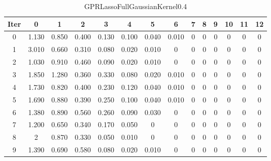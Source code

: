 \begin{table}
	\begin{center}
		\begin{tabular}{|c|c|c|c|c|c|c|c|c|c|c|c|c|c|}
			\hline
			Iter & 0 & 1 & 2 & 3 & 4 & 5 & 6 & 7 & 8 & 9 & 10 & 11 & 12 \\
			\hline
			0 & 1.130 & 0.850 & 0.400 & 0.130 & 0.100 & 0.040 & 0.010 & 0 & 0 & 0 & 0 & 0 & 0 \\
			\hline
			1 & 3.010 & 0.660 & 0.310 & 0.080 & 0.020 & 0.010 & 0 & 0 & 0 & 0 & 0 & 0 & 0 \\
			\hline
			2 & 1.030 & 0.910 & 0.460 & 0.090 & 0.020 & 0.010 & 0 & 0 & 0 & 0 & 0 & 0 & 0 \\
			\hline
			3 & 1.850 & 1.280 & 0.360 & 0.330 & 0.080 & 0.020 & 0.010 & 0 & 0 & 0 & 0 & 0 & 0 \\
			\hline
			4 & 1.730 & 0.820 & 0.400 & 0.230 & 0.120 & 0.040 & 0.010 & 0 & 0 & 0 & 0 & 0 & 0 \\
			\hline
			5 & 1.690 & 0.880 & 0.390 & 0.250 & 0.100 & 0.040 & 0.010 & 0 & 0 & 0 & 0 & 0 & 0 \\
			\hline
			6 & 1.380 & 0.890 & 0.560 & 0.260 & 0.090 & 0.030 & 0 & 0 & 0 & 0 & 0 & 0 & 0 \\
			\hline
			7 & 1.200 & 0.650 & 0.340 & 0.170 & 0.050 & 0 & 0 & 0 & 0 & 0 & 0 & 0 & 0 \\
			\hline
			8 & 2 & 0.870 & 0.330 & 0.050 & 0.010 & 0 & 0 & 0 & 0 & 0 & 0 & 0 & 0 \\
			\hline
			9 & 1.390 & 0.690 & 0.580 & 0.080 & 0.020 & 0.010 & 0 & 0 & 0 & 0 & 0 & 0 & 0 \\
			\hline
		\end{tabular}
	\end{center}
	\caption{GPRLassoFullGaussianKernel0.4}
\end{table}